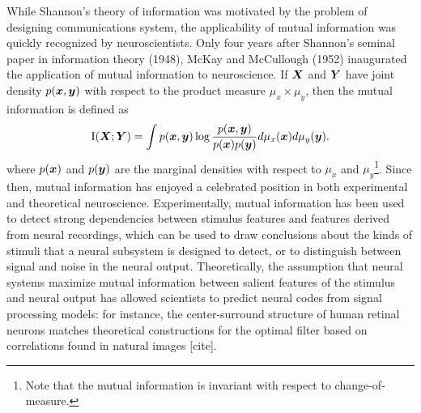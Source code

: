 While Shannon's theory of information was motivated by the problem of
designing communications system, the applicability of mutual
information was quickly recognized by neuroscientists.  Only four
years after Shannon's seminal paper in information theory (1948),
McKay and McCullough (1952) inaugurated the application of mutual
information to neuroscience.  If $\boldsymbol{X}$ and $\boldsymbol{Y}$ have joint density
$p(\boldsymbol{x}, \boldsymbol{y})$ with respect to the product measure $\mu_x \times \mu_y$, then the mutual information is defined as
\[
\text{I}(\boldsymbol{X};\boldsymbol{Y}) = \int p(\boldsymbol{x}, \boldsymbol{y}) \log \frac{p(\boldsymbol{x}, \boldsymbol{y})}{p(\boldsymbol{x})p(\boldsymbol{y})}d\mu_x(\boldsymbol{x}) d\mu_y(\boldsymbol{y}).
\]
where $p(\boldsymbol{x})$ and $p(\boldsymbol{y})$ are the marginal densities with respect to
$\mu_x$ and $\mu_y$\footnote{Note that the mutual information is invariant with respect to change-of-measure.}.  Since then, mutual information has enjoyed a
celebrated position in both experimental and theoretical neuroscience.
Experimentally, mutual information has been used to detect strong
dependencies between stimulus features and features derived from
neural recordings, which can be used to draw conclusions about the
kinds of stimuli that a neural subsystem is designed to detect, or to
distinguish between signal and noise in the neural output.
Theoretically, the assumption that neural systems maximize mutual
information between salient features of the stimulus and neural output
has allowed scientists to predict neural codes from signal processing
models: for instance, the center-surround structure of human retinal
neurons matches theoretical constructions for the optimal filter based
on correlations found in natural images [cite].


